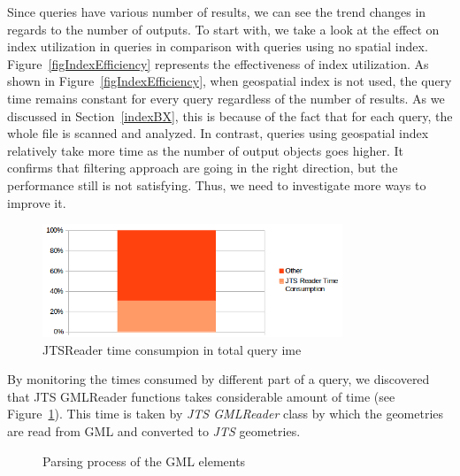 \documentclass[a4paper,12pt]{article}
\begin{document}
Since queries have various number of results, we can see the trend changes in regards to the number of outputs.
To start with, we take a look at the effect on index utilization in queries in comparison with queries using no spatial index. Figure~\ref{figIndexEfficiency} represents the effectiveness of index utilization.
As shown in Figure~\ref{figIndexEfficiency}, when geospatial index is not used, the query time remains constant for every query regardless of the number of results. As we discussed in Section~\ref{indexBX}, this is because of the fact that for each query, the whole file is scanned and analyzed. In contrast, queries using geospatial index relatively take more time as the number of output objects goes higher. It confirms that filtering approach are going in the right direction, but the performance still is not satisfying. Thus, we need to investigate more ways to improve it.
\begin{figure}
\centering
\includegraphics[width=0.8\textwidth]{JTSReadetTimeConsumption}
\caption{JTSReader time consumpion in total query ime}
\label{figJTSReaderTime}
\end{figure}
By monitoring the times consumed by different part of a query, we discovered that JTS GMLReader functions takes considerable amount of time (see Figure~\ref{figJTSReaderTime}). This time is taken by \textit{JTS GMLReader} class by which the geometries are read from GML and converted to \textit{JTS} geometries. 

\begin{figure}
\centering
{}
\centering
{}
\caption{Parsing process of the GML elements}
\label{figParseProcess}
\end{figure}
\end{document}
